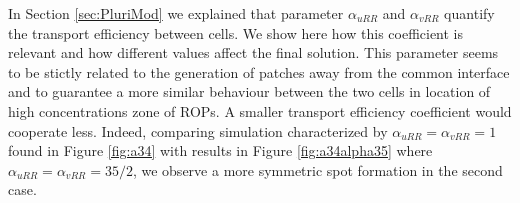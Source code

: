 In Section \ref{sec:PluriMod} we explained that parameter $\alpha_{uRR}$ and $\alpha_{vRR}$ quantify the transport efficiency between cells. We show here how this coefficient is relevant and how different values affect the final solution. This parameter seems to be stictly related to the generation of patches away from the common interface and to guarantee a more similar behaviour between the two cells in location of high concentrations zone of ROPs. A smaller transport efficiency coefficient would cooperate less. Indeed, comparing simulation characterized by $\alpha_{uRR} = \alpha_{vRR} = 1$ found in Figure \ref{fig:a34} with results in Figure \ref{fig:a34alpha35} where $\alpha_{uRR} = \alpha_{vRR} = 35 / 2$, we observe a more symmetric spot formation in the second case.

